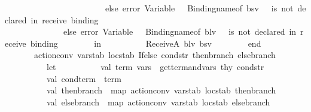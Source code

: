 \begin{isabellebody}
\ \ \ \ \ \ \ \ \ \ \ \ \ \ \ \ \ \ \ \ \ \ \ \ else\ error\ {\isacharparenleft}{\kern0pt}{\isachardoublequote}{\kern0pt}Variable\ {\isachardoublequote}{\kern0pt}\ {\isacharcircum}{\kern0pt}\ {\isacharparenleft}{\kern0pt}Binding{\isachardot}{\kern0pt}name{\isacharunderscore}{\kern0pt}of\ bsv{\isacharparenright}{\kern0pt}\ {\isacharcircum}{\kern0pt}\ {\isachardoublequote}{\kern0pt}\ is\ not\ declared\ {\isacharparenleft}{\kern0pt}in\ receive\ binding{\isacharparenright}{\kern0pt}{\isachardoublequote}{\kern0pt}{\isacharparenright}{\kern0pt}\isanewline
\ \ \ \ \ \ \ \ \ \ \ \ \ \ else\ error\ {\isacharparenleft}{\kern0pt}{\isachardoublequote}{\kern0pt}Variable\ {\isachardoublequote}{\kern0pt}\ {\isacharcircum}{\kern0pt}\ {\isacharparenleft}{\kern0pt}Binding{\isachardot}{\kern0pt}name{\isacharunderscore}{\kern0pt}of\ blv{\isacharparenright}{\kern0pt}\ {\isacharcircum}{\kern0pt}\ {\isachardoublequote}{\kern0pt}\ is\ not\ declared\ {\isacharparenleft}{\kern0pt}in\ receive\ binding{\isacharparenright}{\kern0pt}{\isachardoublequote}{\kern0pt}{\isacharparenright}{\kern0pt}\isanewline
\ \ \ \ \ \ \ \ in\isanewline
\ \ \ \ \ \ \ \ \ \ ReceiveA\ {\isacharparenleft}{\kern0pt}blv{\isacharcomma}{\kern0pt}\ bsv{\isacharparenright}{\kern0pt}\isanewline
\ \ \ \ \ \ \ \ end\isanewline
\isanewline
\ \ \ \ \ \ {\isacharbar}{\kern0pt}\ action{\isacharunderscore}{\kern0pt}conv\ varstab\ locstab\ {\isacharparenleft}{\kern0pt}Ifelse\ {\isacharparenleft}{\kern0pt}{\isacharparenleft}{\kern0pt}cond{\isacharunderscore}{\kern0pt}str{\isacharcomma}{\kern0pt}\ then{\isacharunderscore}{\kern0pt}branch{\isacharparenright}{\kern0pt}{\isacharcomma}{\kern0pt}\ else{\isacharunderscore}{\kern0pt}branch{\isacharparenright}{\kern0pt}{\isacharparenright}{\kern0pt}\ {\isacharequal}{\kern0pt}\isanewline
\ \ \ \ \ \ \ \ \ \ let\isanewline
\ \ \ \ \ \ \ \ \ \ val\ {\isacharparenleft}{\kern0pt}term{\isacharcomma}{\kern0pt}\ vars{\isacharparenright}{\kern0pt}\ {\isacharequal}{\kern0pt}\ get{\isacharunderscore}{\kern0pt}term{\isacharunderscore}{\kern0pt}and{\isacharunderscore}{\kern0pt}vars\ thy\ cond{\isacharunderscore}{\kern0pt}str\isanewline
\ \ \ \ \ \ \ \ \ \ val\ cond{\isacharunderscore}{\kern0pt}term\ {\isacharequal}{\kern0pt}\ term\isanewline
\ \ \ \ \ \ \ \ \ \ val\ then{\isacharunderscore}{\kern0pt}branch{\isacharprime}{\kern0pt}\ {\isacharequal}{\kern0pt}\ map\ {\isacharparenleft}{\kern0pt}action{\isacharunderscore}{\kern0pt}conv\ varstab\ locstab{\isacharparenright}{\kern0pt}\ then{\isacharunderscore}{\kern0pt}branch\isanewline
\ \ \ \ \ \ \ \ \ \ val\ else{\isacharunderscore}{\kern0pt}branch{\isacharprime}{\kern0pt}\ {\isacharequal}{\kern0pt}\ map\ {\isacharparenleft}{\kern0pt}action{\isacharunderscore}{\kern0pt}conv\ varstab\ locstab{\isacharparenright}{\kern0pt}\ else{\isacharunderscore}{\kern0pt}branch\isanewline

\end{isabellebody}
